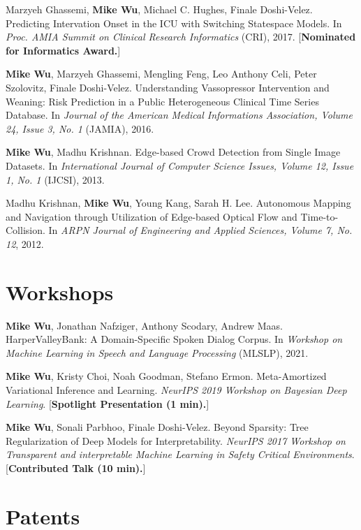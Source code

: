 \documentclass[margin, 10pt]{res} %
\begin{document}
\begin{resume}
Marzyeh Ghassemi, \textbf{Mike Wu}, Michael C. Hughes, Finale Doshi-Velez. Predicting Intervation Onset in the ICU with Switching Statespace Models. In \textit{Proc. AMIA Summit on Clinical Research Informatics} (CRI), 2017. [\textbf{Nominated for Informatics Award.}]

\textbf{Mike Wu}, Marzyeh Ghassemi, Mengling Feng, Leo Anthony Celi, Peter Szolovitz, Finale Doshi-Velez. Understanding Vassopressor Intervention and Weaning: Risk Prediction in a Public Heterogeneous Clinical Time Series Database. In \textit{Journal of the American Medical Informations Association, Volume 24, Issue 3, No. 1} (JAMIA), 2016.

\textbf{Mike Wu}, Madhu Krishnan. Edge-based Crowd Detection from Single Image Datasets. In \textit{International Journal of Computer Science Issues, Volume 12, Issue 1, No. 1} (IJCSI), 2013.

Madhu Krishnan, \textbf{Mike Wu}, Young Kang, Sarah H. Lee. Autonomous Mapping and Navigation through Utilization of Edge-based Optical Flow and Time-to-Collision. In \textit{ARPN Journal of Engineering and Applied Sciences, Volume 7, No. 12}, 2012.

\section{Workshops}

\textbf{Mike Wu}, Jonathan Nafziger, Anthony Scodary, Andrew Maas. HarperValleyBank: A Domain-Specific Spoken Dialog Corpus. In \textit{Workshop on Machine Learning in Speech and Language Processing} (MLSLP), 2021.

\textbf{Mike Wu}, Kristy Choi, Noah Goodman, Stefano Ermon. Meta-Amortized Variational Inference and Learning. \textit{NeurIPS 2019 Workshop on Bayesian Deep Learning}. [\textbf{Spotlight Presentation (1 min).}]

\textbf{Mike Wu}, Sonali Parbhoo, Finale Doshi-Velez. Beyond Sparsity: Tree Regularization of Deep Models for Interpretability. \textit{NeurIPS 2017 Workshop on Transparent and interpretable Machine Learning in Safety Critical Environments}. [\textbf{Contributed Talk (10 min).}]


\section{Patents}


\end{resume}
\end{document}
